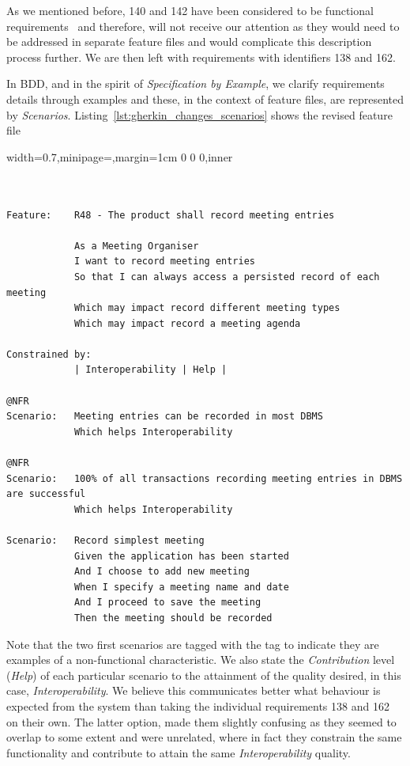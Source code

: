 \documentclass[dissertation,final]{softeng}
\newenvironment{featurecode}[1]
{ \lrbox\featurebox \begin{adjustbox}{width=#1\textwidth,minipage=\textwidth,margin=1cm 0 0 0,inner} }
{ \end{adjustbox}\endlrbox}
\newenvironment{featurelist}[2]
{
\newcommand{\setcaption}{\caption{#1}}
\newcommand{\setlabel}{\label{#2}}
}
{\begin{listing}[h!]\centering\usebox\featurebox\setcaption\setlabel\end{listing}}
\begin{document}
As we mentioned before, 140 and 142 have been considered to be functional requirements~\citep{MylopoulosOnt2014} and therefore, will not receive our attention as they would need to be addressed in separate feature files and would complicate this description process further. We are then left with requirements with identifiers 138 and 162.

In BDD, and in the spirit of \emph{Specification by Example}, we clarify requirements details through examples and these, in the context of feature files, are represented by \emph{Scenarios}. Listing~\ref{lst:gherkin_changes_scenarios} shows the revised feature file

\begin{featurelist}{Changes to Gherkin -- Scenarios}{lst:gherkin_changes_scenarios}
\begin{featurecode}{0.7}
\begin{verbatim}


Feature:    R48 - The product shall record meeting entries

            As a Meeting Organiser
            I want to record meeting entries
            So that I can always access a persisted record of each meeting
            Which may impact record different meeting types
            Which may impact record a meeting agenda
	
Constrained by:
            | Interoperability | Help |

@NFR
Scenario:   Meeting entries can be recorded in most DBMS
            Which helps Interoperability

@NFR	
Scenario:   100% of all transactions recording meeting entries in DBMS are successful
            Which helps Interoperability

Scenario:   Record simplest meeting
            Given the application has been started
            And I choose to add new meeting
            When I specify a meeting name and date
            And I proceed to save the meeting
            Then the meeting should be recorded
\end{verbatim}
\end{featurecode}
\end{featurelist}

Note that the two first scenarios are tagged with the tag \emph{\@NFR} to indicate they are examples of a non-functional characteristic. We also state the \emph{Contribution} level (\emph{Help}) of each particular scenario to the attainment of the quality desired, in this case, \emph{Interoperability}. We believe this communicates better what behaviour is expected from the system than taking the individual requirements 138 and 162 on their own. The latter option, made them slightly confusing as they seemed to overlap to some extent and were unrelated, where in fact they constrain the same functionality and contribute to attain the same \emph{Interoperability} quality.
\end{document}
